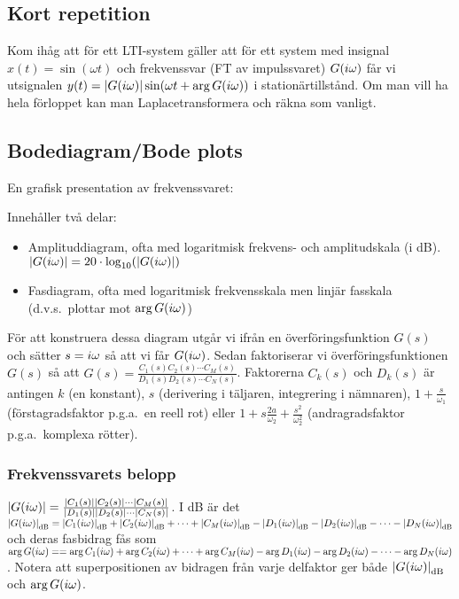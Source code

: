 \documentclass[a4paper]{article}
\begin{document}
\providecommand\fname{}
\renewcommand\fname{19-10-03}

\subsection{Kort repetition}
Kom ihåg att för ett LTI-system gäller att för ett system med insignal \(
    x(t) = \sin(\omega t)
\) och frekvenssvar (FT av impulssvaret) \(
    G(i\omega)
\) får vi utsignalen \(
    y(t) = \abs{G(i\omega)} \sin(\omega t + \arg{G(i\omega)})
\) i stationärtillstånd. Om man vill ha hela förloppet kan man 
Laplacetransformera och räkna som vanligt.

\subsection{Bodediagram/Bode plots}
En grafisk presentation av frekvenssvaret:

Innehåller två delar:
\begin{itemize}
    \item Amplituddiagram, ofta med logaritmisk frekvens- och amplitudskala 
    (i \si{\deci\bel}). \(
        \abs{G(i\omega)} = 20 \cdot \log_{10}(\abs{G(i\omega)})
    \) 
    \item Fasdiagram, ofta med logaritmisk frekvensskala men linjär fasskala 
    (d.v.s.\ plottar mot \(
        \arg{G(i\omega)}
    \))
\end{itemize}

För att konstruera dessa diagram utgår vi ifrån en överföringsfunktion \(
    G(s)
\) och sätter \(
    s=i\omega
\) så att vi får \(
    G(i\omega)
\). Sedan faktoriserar vi överföringsfunktionen \(
    G(s)
\) så att \(
    G(s) = \frac{C_1(s)C_2(s)\cdots C_M(s)}{D_1(s)D_2(s)\cdots C_N(s)} 
\). Faktorerna \(
    C_k(s)
\) och \(
    D_k(s)
\) är antingen \(
    k
\) (en konstant), \(
    s
\) (derivering i täljaren, integrering i nämnaren), \(
    1 + \frac{s}{\omega_1} 
\) (förstagradsfaktor p.g.a.\ en reell rot) eller \(
    1 + s \frac{2a}{\omega_2} + \frac{s^2}{\omega_2^2} 
\) (andragradsfaktor p.g.a.\ komplexa rötter).

\subsubsection{Frekvenssvarets belopp}
\(
    \abs{G(i\omega)} = \frac{\abs{C_1(s)}\abs{C_2(s)}\cdots \abs{C_M(s)}}{\abs{D_1(s)}\abs{D_2(s)}\cdots \abs{C_N(s)}}
\). I \si{\deci\bel} är det \(
    \abs{G(\io)}_{\si{\deci\bel}}
        = \abs{C_1(\io)}_{\si{\deci\bel}} + \abs{C_2(\io)}_{\si{\deci\bel}} + \cdots + \abs{C_M(\io)}_{\si{\deci\bel}}
            - \abs{D_1(\io)}_{\si{\deci\bel}} - \abs{D_2(\io)}_{\si{\deci\bel}} - \cdots - \abs{D_N(\io)}_{\si{\deci\bel}}
\) och deras fasbidrag fås som \(
    \arg{G(i\omega)} =
    = \arg{C_1(i\omega)} + \arg{C_2(i\omega)} + \cdots + \arg{C_M(i\omega)}
        - \arg{D_1(i\omega)} - \arg{D_2(i\omega)} - \cdots - \arg{D_N(i\omega)}
\). Notera att superpositionen av bidragen från varje delfaktor ger både \(
    \abs{G(\io)}_{\si{\deci\bel}}
\) och \(
    \arg{G(i\omega)}
\).
\end{document}

